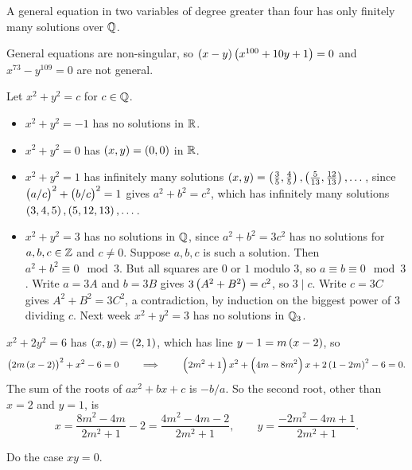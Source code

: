 \begin{theorem}
A general equation in two variables of degree greater than four has only finitely many solutions over $ \mathbb{Q} $.
\end{theorem}

General equations are non-singular, so $ \br{x - y}\br{x^{100} + 10y + 1} = 0 $ and $ x^{73} - y^{109} = 0 $ are not general.

\begin{example}
Let $ x^2 + y^2 = c $ for $ c \in \mathbb{Q} $.
\begin{itemize}
\item $ x^2 + y^2 = -1 $ has no solutions in $ \mathbb{R} $.
\item $ x^2 + y^2 = 0 $ has $ \br{x, y} = \br{0, 0} $ in $ \mathbb{R} $.
\item $ x^2 + y^2 = 1 $ has infinitely many solutions $ \br{x, y} = \br{\tfrac{3}{5}, \tfrac{4}{5}}, \br{\tfrac{5}{13}, \tfrac{12}{13}}, \dots $, since $ \br{a / c}^2 + \br{b / c}^2 = 1 $ gives $ a^2 + b^2 = c^2 $, which has infinitely many solutions $ \br{3, 4, 5}, \br{5, 12, 13}, \dots $.
\item $ x^2 + y^2 = 3 $ has no solutions in $ \mathbb{Q} $, since $ a^2 + b^2 = 3c^2 $ has no solutions for $ a, b, c \in \mathbb{Z} $ and $ c \ne 0 $. Suppose $ a, b, c $ is such a solution. Then $ a^2 + b^2 \equiv 0 \mod 3 $. But all squares are $ 0 $ or $ 1 $ modulo $ 3 $, so $ a \equiv b \equiv 0 \mod 3 $. Write $ a = 3A $ and $ b = 3B $ gives $ 3\br{A^2 + B^2} = c^2 $, so $ 3 \mid c $. Write $ c = 3C $ gives $ A^2 + B^2 = 3C^2 $, a contradiction, by induction on the biggest power of $ 3 $ dividing $ c $. Next week $ x^2 + y^2 = 3 $ has no solutions in $ \mathbb{Q}_3 $.
\end{itemize}
\end{example}

\begin{example}
$ x^2 + 2y^2 = 6 $ has $ \br{x, y} = \br{2, 1} $, which has line $ y - 1 = m\br{x - 2} $, so
$$ \br{2m\br{x - 2}}^2 + x^2 - 6 = 0 \qquad \implies \qquad \br{2m^2 + 1}x^2 + \br{4m - 8m^2}x + 2\br{1 - 2m}^2 - 6 = 0. $$
The sum of the roots of $ ax^2 + bx + c $ is $ -b / a $. So the second root, other than $ x = 2 $ and $ y = 1 $, is
$$ x = \dfrac{8m^2 - 4m}{2m^2 + 1} - 2 = \dfrac{4m^2 - 4m - 2}{2m^2 + 1}, \qquad y = \dfrac{-2m^2 - 4m + 1}{2m^2 + 1}. $$
\end{example}

\begin{exercise}
Do the case $ xy = 0 $.
\end{exercise}

